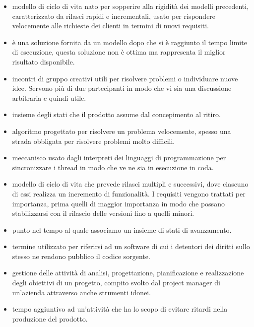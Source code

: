 
\begin{itemize} 
	\item {} modello di ciclo di vita nato per sopperire alla rigidità dei modelli precedenti, caratterizzato da rilasci rapidi e incrementali, usato per rispondere velocemente alle richieste dei clienti in termini di nuovi requisiti.
	\item {} è una soluzione fornita da un modello dopo che si è raggiunto il tempo limite di esecuzione, questa soluzione non è ottima ma rappresenta il miglior risultato disponibile.
	\item {} incontri di gruppo creativi utili per risolvere problemi o individuare nuove idee. Servono più di due partecipanti in modo che vi sia una discussione arbitraria e quindi utile.
	\item {} insieme degli stati che il prodotto assume dal concepimento al ritiro.
	\item {} algoritmo progettato per risolvere un problema velocemente, spesso una strada obbligata per risolvere problemi molto difficili.
	\item {} meccanisco usato dagli interpreti dei linguaggi di programmazione per sincronizzare i thread in modo che ve ne sia in esecuzione in coda.
	\item {} modello di ciclo di vita che prevede rilasci multipli e successivi, dove ciascuno di essi realizza un incremento di funzionalità. I requisiti vengono trattati per importanza, prima quelli di maggior importanza in modo che possano stabilizzarsi con il rilascio delle versioni fino a quelli minori.
	\item {} punto nel tempo al quale associamo un insieme di stati di avanzamento.
	\item {} termine utilizzato per riferirsi ad un software di cui i detentori dei diritti sullo stesso ne rendono pubblico il codice sorgente.
	\item {} gestione delle attività di analisi, progettazione, pianificazione e realizzazione degli obiettivi di un progetto, compito svolto dal project manager di un'azienda attraverso anche strumenti idonei.
	\item {} tempo aggiuntivo ad un'attività che ha lo scopo di evitare ritardi nella produzione del prodotto.

\end{itemize}
